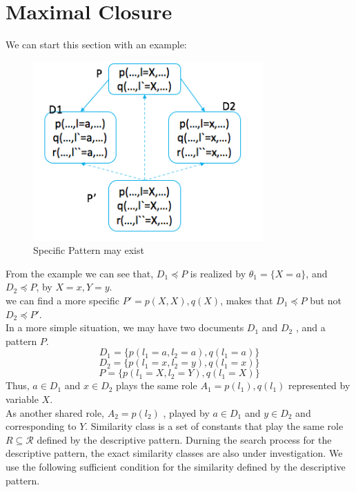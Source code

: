 \section{Maximal Closure}

We can start this section with an example:\\
\begin{figure}[!h]
\centering
\includegraphics[width=250pt]{./pictures/0305.png}
\caption{Specific Pattern may exist}
\end{figure}
From the example we can see that, $D_1\preceq P$ is realized by $\theta_1= \{X=a\}$, and $D_2\preceq P$, by $X=x, Y=y$.\\
we can find a more specific $P' = {p(X,X),q(X)}$, makes that $D_1\preceq P$ but not $D_2\preceq P'$.\\
In a more simple situation, we may have two documents $D_1$ and $D_2$ , and a pattern $P$.
\begin{displaymath}
D_1 = \{p(l_1 = a, l_2 = a),q(l_1 = a)\}
\end{displaymath}
\begin{displaymath}
D_2 = \{p(l_1 = x, l_2 = y),q(l_1 = x)\}
\end{displaymath}
\begin{displaymath}
P = \{p(l_1 = X, l_2 = Y),q(l_1 = X)\}
\end{displaymath}
Thus, $a\in D_1$ and $x\in D_2$ plays the same role $ A_1 = {p(l_1),q(l_1)}$ represented by variable $X$.\\
As another shared role, $A_2 = {p(l_2)}$ , played by $a\in D_1$ and $y\in D_2$ and corresponding to $Y$.
Similarity class is a set of constants that play the same role $R \subseteq \mathcal{R}$ defined by the descriptive pattern. Durning the search process for the descriptive pattern, the exact similarity classes are also under investigation. We use the following sufficient condition for the similarity defined by the descriptive pattern.
